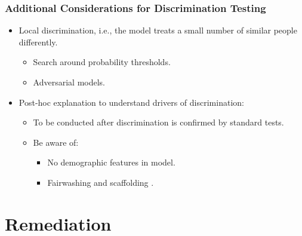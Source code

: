 \documentclass[11pt,aspectratio=169,hyperref={colorlinks}]{beamer}
\begin{document}
		\begin{frame}				
	
			\frametitle{Additional Considerations for Discrimination Testing}
	
			\begin{itemize}
				
				\item Local discrimination, i.e., the model treats a small number of similar people differently. 
				
				\begin{itemize}
					\item Search around probability thresholds.
					\item Adversarial models.
				\end{itemize}
			
				\item Post-hoc explanation to understand drivers of discrimination:
				\begin{itemize}
					
					\item To be conducted after discrimination is confirmed by standard tests.
					
					\item Be aware of: 
					\begin{itemize}
						\item No demographic features in model.
						\item Fairwashing \cite{fair_washing} and scaffolding \cite{scaffolding}. 
					\end{itemize}
				
				\end{itemize}
	
			\end{itemize}
	
		\end{frame}
	

	\section{Remediation}
	
		\subsection*{}
\end{document}
